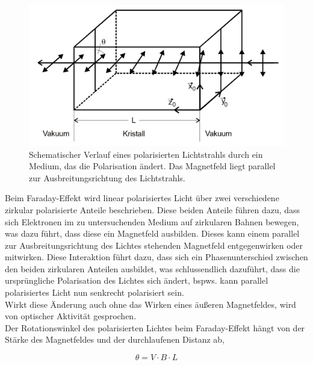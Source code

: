 \begin{figure}[H]
    \centering
    \includegraphics[width=\textwidth]{Bilder/faradayeffekt.png}
    \caption{Schematischer Verlauf eines polarisierten Lichtstrahls durch ein Medium, das die Polarisation ändert. Das Magnetfeld liegt parallel zur Ausbreitungsrichtung des Lichtstrahls. \cite{anhang}}
    \label{fig:faradayeffekt}
\end{figure}
Beim Faraday-Effekt wird linear polarisiertes Licht über zwei verschiedene zirkular polarisierte Anteile beschrieben. Diese beiden Anteile führen dazu, dass sich Elektronen im zu untersuchenden Medium auf zirkularen Bahnen bewegen, was dazu führt, dass diese ein Magnetfeld ausbilden.
Dieses kann einem parallel zur Ausbreitungsrichtung des Lichtes stehenden Magnetfeld entgegenwirken oder mitwirken. Diese Interaktion führt dazu, dass sich ein Phasenunterschied zwischen den beiden zirkularen Anteilen ausbildet,
was schlussendlich dazuführt, dass die ursprüngliche Polarisation des Lichtes sich ändert, bspws. kann parallel polarisiertes Licht nun senkrecht polarisiert sein. \\
Wirkt diese Änderung auch ohne das Wirken eines äußeren Magnetfeldes, wird von optischer Aktivität gesprochen. \\
Der Rotationswinkel des polarisierten Lichtes beim Faraday-Effekt hängt von der Stärke des Magnetfeldes und der durchlaufenen Distanz ab,

\begin{equation*}
    \theta = V \cdot B \cdot L 
    \label{eq:verdet}
\end{equation*}

